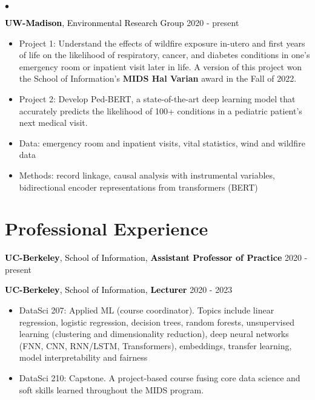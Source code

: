 \documentclass[margin,line]{res}                          %
\newenvironment{list1}{
  \begin{list}{\ding{113}}{%
      \setlength{\itemsep}{0in}
      \setlength{\parsep}{0in} \setlength{\parskip}{0in}
      \setlength{\topsep}{0in} \setlength{\partopsep}{0in} 
      \setlength{\leftmargin}{0.17in}}}{\end{list}}
\newenvironment{list2}{
  \begin{list}{$\bullet$}{%
      \setlength{\itemsep}{0in}
      \setlength{\parsep}{0in} \setlength{\parskip}{0in}
      \setlength{\topsep}{0in} \setlength{\partopsep}{0in} 
      \setlength{\leftmargin}{0.2in}}}{\end{list}}
\begin{document}
\begin{resume}
\begin{list2}
\item[] \textcolor{Black}{\textbf{UW-Madison}, Environmental Research Group} \hspace{4.9cm}2020 - present
\begin{itemize}
\item Project 1: Understand the effects of wildfire exposure in-utero and first years of life on the likelihood of respiratory, cancer, and diabetes conditions in one's emergency room or inpatient visit later in life. A version of this project won the School of Information's \textbf{MIDS Hal Varian} award in the Fall of 2022.
\item Project 2: Develop Ped-BERT, a state-of-the-art deep learning model that accurately predicts the likelihood of 100+ conditions in a pediatric patient's next medical visit.
\item Data: emergency room and inpatient visits, vital statistics, wind and wildfire data
\item Methods: record linkage, causal analysis with instrumental variables, bidirectional encoder representations from transformers (BERT)
\end{itemize}
\item[]
\end{list2}





\section{\sc Professional Experience}
\begin{list1}

\item[] \textcolor{Black}{\textbf{UC-Berkeley}, School of Information, \textbf{Assistant Professor of Practice}} \hspace{1.0cm}2020 - present
\item[]

\item[] \textcolor{Black}{\textbf{UC-Berkeley}, School of Information, \textbf{Lecturer}} \hspace{5.5cm}2020 - 2023
\begin{itemize}
\item DataSci 207: Applied ML (course coordinator). Topics include linear regression, logistic regression, decision trees, random forests,  unsupervised learning (clustering and dimensionality reduction), deep neural networks (FNN, CNN, RNN/LSTM, Transformers), embeddings, transfer learning, model interpretability and fairness
\item DataSci 210: Capstone. A project-based course fusing core data science and soft skills learned throughout the MIDS program.
\end{itemize}
\item[]



\end{list1}
\end{resume}
\end{document}
